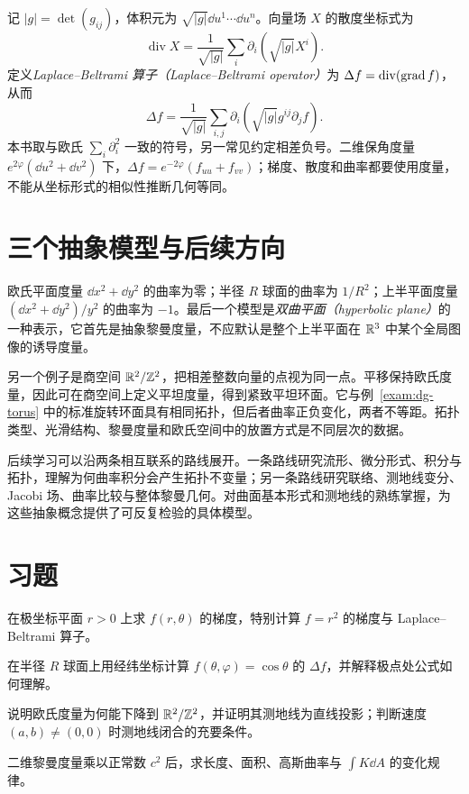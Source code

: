 记 $|g|=\det(g_{ij})$，体积元为 $\sqrt{|g|}\dd u^1\cdots\dd u^n$。向量场 $X$ 的散度坐标式为
\[
 \operatorname{div}X=\frac1{\sqrt{|g|}}\sum_i\partial_i(\sqrt{|g|}X^i).
\]
定义\emph{Laplace--Beltrami 算子（Laplace--Beltrami operator）}为 $\Delta f=\operatorname{div}(\operatorname{grad} f)$，从而
\begin{equation}
 \Delta f=\frac1{\sqrt{|g|}}\sum_{i,j}
 \partial_i\left(\sqrt{|g|}g^{ij}\partial_jf\right).
 \label{eq:dg-laplacian}
\end{equation}
本书取与欧氏 $\sum_i\partial_i^2$ 一致的符号，另一常见约定相差负号。二维保角度量 $e^{2\varphi}(\dd u^2+\dd v^2)$ 下，$\Delta f=e^{-2\varphi}(f_{uu}+f_{vv})$；梯度、散度和曲率都要使用度量，不能从坐标形式的相似性推断几何等同。

\section{三个抽象模型与后续方向}
欧氏平面度量 $\dd x^2+\dd y^2$ 的曲率为零；半径 $R$ 球面的曲率为 $1/R^2$；上半平面度量 $(\dd x^2+\dd y^2)/y^2$ 的曲率为 $-1$。最后一个模型是\emph{双曲平面（hyperbolic plane）}的一种表示，它首先是抽象黎曼度量，不应默认是整个上半平面在 $\mathbb R^3$ 中某个全局图像的诱导度量。

另一个例子是商空间 $\mathbb R^2/\mathbb Z^2$，把相差整数向量的点视为同一点。平移保持欧氏度量，因此可在商空间上定义平坦度量，得到紧致平坦环面。它与例~\ref{exam:dg-torus} 中的标准旋转环面具有相同拓扑，但后者曲率正负变化，两者不等距。拓扑类型、光滑结构、黎曼度量和欧氏空间中的放置方式是不同层次的数据。

后续学习可以沿两条相互联系的路线展开。一条路线研究流形、微分形式、积分与拓扑，理解为何曲率积分会产生拓扑不变量；另一条路线研究联络、测地线变分、Jacobi 场、曲率比较与整体黎曼几何。对曲面基本形式和测地线的熟练掌握，为这些抽象概念提供了可反复检验的具体模型。

\section{习题}
\begin{exercise}\label{ex:dg-manifolds-gradient}
在极坐标平面 $r>0$ 上求 $f(r,\theta)$ 的梯度，特别计算 $f=r^2$ 的梯度与 Laplace--Beltrami 算子。
\end{exercise}
\begin{exercise}\label{ex:dg-manifolds-sphere-laplace}
在半径 $R$ 球面上用经纬坐标计算 $f(\theta,\varphi)=\cos\theta$ 的 $\Delta f$，并解释极点处公式如何理解。
\end{exercise}
\begin{exercise}\label{ex:dg-manifolds-flat-torus}
说明欧氏度量为何能下降到 $\mathbb R^2/\mathbb Z^2$，并证明其测地线为直线投影；判断速度 $(a,b)\ne(0,0)$ 时测地线闭合的充要条件。
\end{exercise}
\begin{exercise}\label{ex:dg-manifolds-scale}
二维黎曼度量乘以正常数 $c^2$ 后，求长度、面积、高斯曲率与 $\int K\dd A$ 的变化规律。
\end{exercise}

